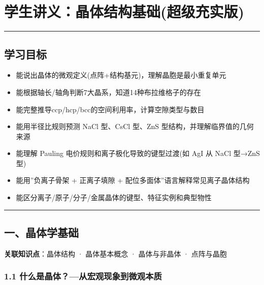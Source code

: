 \section{学生讲义：晶体结构基础(超级充实版)}\label{ux5b66ux751fux8bb2ux4e49ux6676ux4f53ux7ed3ux6784ux57faux7840ux8d85ux7ea7ux5145ux5b9eux7248}

\begin{center}\rule{0.5\linewidth}{0.5pt}\end{center}

\subsection{学习目标}\label{ux5b66ux4e60ux76eeux6807}

\begin{itemize}
\tightlist
\item
  能说出晶体的微观定义(点阵+结构基元)，理解晶胞是最小重复单元
\item
  能根据轴长/轴角判断7大晶系，知道14种布拉维格子的存在
\item
  能完整推导ccp/hcp/bcc的空间利用率，计算空隙类型与数目
\item
  能用半径比规则预测 NaCl 型、CsCl 型、ZnS 型结构，并理解临界值的几何来源
\item
  能理解 Pauling 电价规则和离子极化导致的键型过渡(如 AgI 从 NaCl 型→ZnS 型)
\item
  能用''负离子骨架 + 正离子填隙 + 配位多面体''语言解释常见离子晶体结构
\item
  能区分离子/原子/分子/金属晶体的键型、特征实例和典型物性
\end{itemize}

\begin{center}\rule{0.5\linewidth}{0.5pt}\end{center}

\subsection{一、晶体学基础}\label{ux4e00ux6676ux4f53ux5b66ux57faux7840}

\textbf{关联知识点}：晶体结构 · 晶体基本概念 · 晶体与非晶体 · 点阵与晶胞

\subsubsection{1.1 什么是晶体？---从宏观现象到微观本质}\label{ux4ec0ux4e48ux662fux6676ux4f53ux4eceux5b8fux89c2ux73b0ux8c61ux5230ux5faeux89c2ux672cux8d28}

